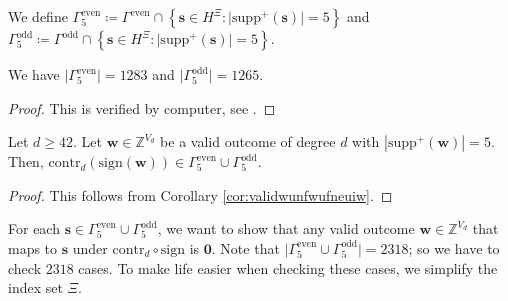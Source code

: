 \begin{definition}
    We define \( \Gamma^{\mathrm{even}}_5 \coloneqq \Gamma^{\mathrm{even}} \cap \left\{ \mathbf{s} \in H^{\Xi} : \lvert \mathrm{supp}^+(\mathbf{s}) \rvert = 5 \right\} \) and \( \Gamma^{\mathrm{odd}}_5 \coloneqq \Gamma^{\mathrm{odd}} \cap \left\{ \mathbf{s} \in H^{\Xi} : \lvert \mathrm{supp}^+(\mathbf{s}) \rvert = 5 \right\} \).
\end{definition}

\begin{proposition}
    We have \( \lvert \Gamma^{\mathrm{even}}_5 \rvert  = 1283\) and \( \lvert \Gamma^{\mathrm{odd}}_5 \rvert  = 1265\).
\end{proposition}

\begin{proof}
    This is verified by computer, see \cite{ducrepo}.
\end{proof}

\begin{corollary}
    Let \( d\geq 42 \). Let \( \mathbf{w} \in \mathbb{Z}^{V_d} \) be a valid outcome of degree \( d \) with \( |\mathrm{supp}^+(\mathbf w)| = 5 \). Then, \( \mathrm{contr}_d(\mathrm{sign}(\mathbf{w})) \in \Gamma^{\mathrm{even}}_5 \cup \Gamma^{\mathrm{odd}}_5 \).
\end{corollary}

\begin{proof}
    This follows from Corollary \ref{cor:validwunfwufneuiw}.
\end{proof}

For each \( \mathbf{s} \in \Gamma^{\mathrm{even}}_5 \cup \Gamma^{\mathrm{odd}}_5 \), we want to show that any valid outcome \( \mathbf{w} \in \mathbb{Z}^{V_d} \) that maps to \( \mathbf{s} \) under \( \mathrm{contr}_d \circ \mathrm{sign} \) is \( \mathbf{0} \). Note that \( \lvert \Gamma^{\mathrm{even}}_5 \cup \Gamma^{\mathrm{odd}}_5 \rvert = 2318 \); so we have to check \( 2318 \) cases. To make life easier when checking these cases, we simplify the index set \( \Xi \).

